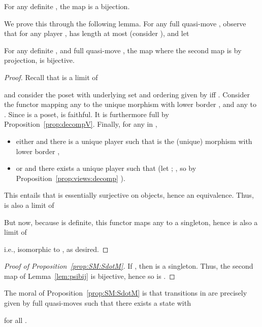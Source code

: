 \documentclass{LMCS}
\theoremstyle{plain}\newtheorem{satz}[thm]{Satz}
\begin{document}
\begin{prop}\label{prop:SM:SdotM}
  For any definite , the map  is a bijection.
\end{prop}
We prove this through the following lemma.
For any full quasi-move , observe that for any
player ,  has length at most 
(consider ), and let 
\begin{lem}\label{lem:psibij}
  For any definite , and full quasi-move ,
  the map
   where the
  second map is by projection, is bijective.
\end{lem}
\begin{proof}
  Recall that  is a limit of
   
  and consider the poset  with underlying set  and ordering given by  iff .
  Consider the functor  mapping any  to the unique morphism  with lower border
  , and any  to . Since 
  is a poset,  is faithful.  It is furthermore full by
  Proposition~\ref{prop:decompV}.  Finally,
  for any  in ,
  \begin{itemize}
  \item either  and there is a unique player  such that  is the (unique) morphism 
    with lower border ,
  \item or  and there exists a unique player  such that  (let ; , so by
    Proposition~\ref{prop:views:decomp} ).
  \end{itemize}
  This entails that  is essentially surjective on objects, hence an equivalence.
  Thus,  is also a limit of 

   

  But now, because  is definite, this functor maps any  to a singleton, hence  is also a limit of
 
i.e., isomorphic to ,
as desired.
\end{proof}

\begin{proof}[Proof of Proposition~\ref{prop:SM:SdotM}]
  If , then  is a
  singleton. Thus, the second map of Lemma~\ref{lem:psibij} is bijective, hence so is .
\end{proof}

The moral of Proposition~\ref{prop:SM:SdotM} is that transitions
 in  are precisely given by full
quasi-moves  such that there exists a state
 with

for all .
\end{document}
